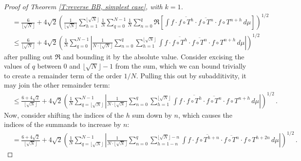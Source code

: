 \documentclass[11pt, oneside]{amsart}   	%
\newcommand{\1}{\mathbbm{1}}
\newcommand{\floor}[1]{\lfloor#1\rfloor}
\theoremstyle{definition}
\begin{document}
\begin{proof}[Proof of Theorem \ref{T:reverse BB, simplest case}, with $k=1$]
\begin{align*}
&= \frac{6}{\floor{\sqrt{N}}} +  4\sqrt{2}\left( \frac{1}{\floor{\sqrt{N}}}\sum_{h=1}^{\floor{\sqrt{N}}} \frac{1}{N} \sum_{q=0}^{N-1} \frac{1}{N} \sum_{n = 0}^{q} \Re \left[\int f \cdot \overline{f\circ T^{h}} \cdot \overline{f \circ T^n} \cdot f\circ T^{n+h} \, d\mu \right] \right)^{1/2} \\
&\leq \frac{6}{\floor{\sqrt{N}}} + 4\sqrt{2} \left(  \frac{1}{N} \sum_{q=0}^{N-1} \left|\frac{1}{N \cdot \floor{\sqrt{N}}}  \sum_{n = 0}^{q} \sum_{h=1}^{\floor{\sqrt{N}}} \int f \cdot \overline{f\circ T^{h}} \cdot \overline{f \circ T^n} \cdot f\circ T^{n+h} \, d\mu \right| \right)^{1/2}
\end{align*}
after pulling out $\Re$ and bounding it by the absolute value. Consider excising the values of $q$ between $0$ and $\floor{\sqrt{N}}-1$ from the sum, which we can bound trivially to create a remainder term of the order $1/N$. Pulling this out by subadditivity, it may join the other remainder term:
\begin{align*}
&\leq \frac{6 +4\sqrt{2}}{\floor{\sqrt{N}}} + 4\sqrt{2} \left(  \frac{1}{N} \sum_{q=\floor{\sqrt{N}}}^{N-1} \left|\frac{1}{N \cdot \floor{\sqrt{N}}}  \sum_{n = 0}^{q} \sum_{h=1}^{\floor{\sqrt{N}}} \int f \cdot \overline{f\circ T^{h}} \cdot \overline{f \circ T^n} \cdot f\circ T^{n+h} \, d\mu \right| \right)^{1/2}\, .
\end{align*}
Now, consider shifting the indices of the $h$ sum down by $n$, which causes the indices of the summands to increase by $n$:
\begin{align*}
&= \frac{6 +4\sqrt{2}}{\floor{\sqrt{N}}} + 4\sqrt{2} \left(  \frac{1}{N} \sum_{q=\floor{\sqrt{N}}}^{N-1} \left|\frac{1}{N \cdot \floor{\sqrt{N}}}  \sum_{n = 0}^{q} \sum_{h=1-n}^{\floor{\sqrt{N}}-n} \int f \cdot \overline{f\circ T^{h+n}} \cdot \overline{f \circ T^n} \cdot f\circ T^{h+2n} \, d\mu \right| \right)^{1/2} \, .
\end{align*}


\end{proof}
\end{document}
